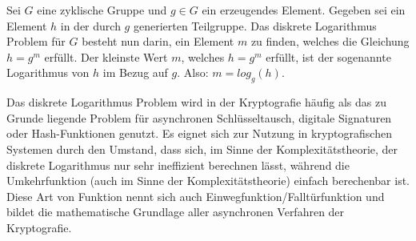 Sei $ G $ eine zyklische Gruppe und $ g \in G $ ein erzeugendes Element. Gegeben sei ein Element $h$ in der durch $g$ generierten Teilgruppe.
Das diskrete Logarithmus Problem für $G$ besteht nun darin, ein Element $m$ zu finden, welches die Gleichung $ h = g^m $ erfüllt.
Der kleinste Wert $m$, welches $h = g^m$ erfüllt, ist der sogenannte Logarithmus von $h$ im Bezug auf $g$. Also: $m = log_g(h)$.

Das diskrete Logarithmus Problem wird in der Kryptografie häufig als das zu Grunde liegende Problem für asynchronen Schlüsseltausch, digitale Signaturen oder Hash-Funktionen genutzt. Es eignet sich zur Nutzung in kryptografischen
Systemen durch den Umstand, dass sich, im Sinne der Komplexitätstheorie, der diskrete Logarithmus nur sehr ineffizient
berechnen lässt, während die Umkehrfunktion (auch im Sinne der Komplexitätstheorie) einfach berechenbar ist.
Diese Art von Funktion nennt sich auch Einwegfunktion/Falltürfunktion und bildet die mathematische Grundlage aller asynchronen 
Verfahren der Kryptografie.	


